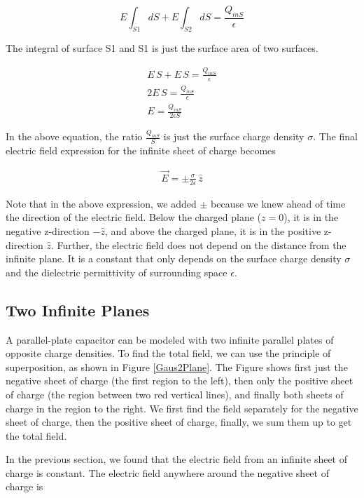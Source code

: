 \documentclass{ximera}
\begin{document}
 

\begin{equation}
E \int_{S1} dS + E \int_{S2} dS = \frac{Q_{inS}}{\epsilon}
\end{equation}

 The integral of surface S1 and S1 is just the surface area of two surfaces.
 
\begin{eqnarray}
E \, S + E \, S = \frac{Q_{inS}}{\epsilon} \\
 2 E \,S = \frac{Q_{inS}}{\epsilon} \\
 E=\frac{Q_{inS}}{2 \epsilon S}
\end{eqnarray}

In the above equation, the ratio $\frac{Q_{inS}}{S}$ is just the surface charge density $\sigma$. The final electric field expression for the infinite sheet of charge becomes

\begin{eqnarray}
 \vec{E}  = \pm \frac{\sigma}{2 \epsilon } \, \hat{z}
\end{eqnarray}

Note that in the above expression, we added $\pm$ because we knew ahead of time the direction of the electric field. Below the charged plane ($z=0$), it is in the negative z-direction $-\hat{z}$, and above the charged plane, it is in the positive z-direction $\hat{z}$. Further, the electric field does not depend on the distance from the infinite plane. It is a constant that only depends on the surface charge density $\sigma$ and the dielectric permittivity of surrounding space $\epsilon$.

\subsection{Two Infinite Planes}


A parallel-plate capacitor can be modeled with two infinite parallel plates of opposite charge densities. To find the total field, we can use the principle of superposition, as shown in Figure \ref{Gaus2Plane}. The Figure shows first just the negative sheet of charge (the first region to the left), then only the positive sheet of charge (the region between two red vertical lines), and finally both sheets of charge in the region to the right. We first find the field separately for the negative sheet of charge, then the positive sheet of charge, finally, we sum them up to get the total field. 

In the previous section, we found that the electric field from an infinite sheet of charge is constant. The electric field anywhere around the negative sheet of charge is
\end{document}
